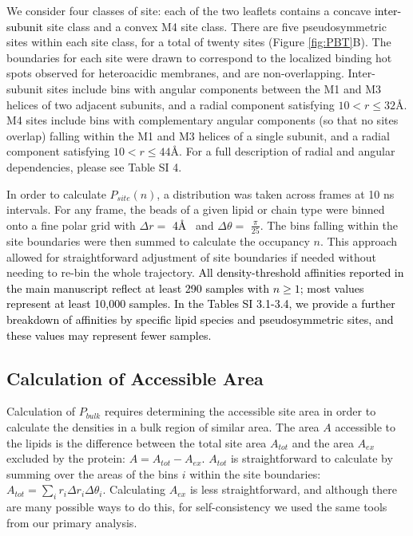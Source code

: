 \documentclass[%
 aip,
 amsmath,amssymb,
 preprint,%
]{revtex4-1}\usepackage{setspace}
\newcommand{\liam}[1]{\textcolor{black}{#1}}
\newcommand{\grace}[1]{\textcolor{black}{{#1}}}
\begin{document}
We consider four classes of site: each of the two leaflets contains a concave \liam{inter-subunit} site class and a convex M4 site class. There are five pseudosymmetric sites within each site class, for a total of twenty sites (Figure \ref{fig:PBT}B).  The boundaries for each site were drawn to correspond to the localized binding hot spots observed for heteroacidic membranes\cite{Woods2019}, and are non-overlapping. Inter-subunit sites include bins with angular components between the M1 and M3 helices of two adjacent subunits, and a radial component satisfying $10<r\leq32$\AA.  M4 sites include bins with complementary angular components (so that no sites overlap) falling within the M1 and M3 helices of a single subunit, and a radial component satisfying $10<r\leq44$\AA. For a full description of radial and angular dependencies, please see Table SI 4. 

In order to calculate $P_{site}(n)$, a distribution was taken across frames at 10 ns intervals. For any frame, the  beads of a given lipid or chain type were binned onto a fine polar grid with $\Delta r=$  \liam{4\AA~} and $\Delta \theta=$ $\frac{\pi}{25}$. The bins falling within the site boundaries were then summed to calculate the occupancy $n$.  This approach allowed for straightforward adjustment of site boundaries if needed without needing to re-bin the whole trajectory. \grace{All density-threshold affinities reported in the main manuscript reflect at least 290 samples with $n\ge 1$; most values represent at least 10,000 samples.  In the Tables SI 3.1-3.4, we provide a further breakdown of affinities by specific lipid species and pseudosymmetric sites, and these values may represent fewer samples.} 

\subsection{Calculation of Accessible Area}

Calculation of $P_{bulk}$ requires determining the accessible site area in order to calculate the densities in a bulk region of similar area. The area $A$ accessible to the lipids is the difference between the total site area $A_{tot}$ and the area $A_{ex}$ excluded by the protein: $A = A_{tot} - A_{ex}$\liam{.} 
$A_{tot}$ is straightforward to calculate by summing over the areas of the bins $i$ within the site boundaries: $A_{tot} = \sum_i r_i \Delta r_i  \Delta \theta_i$.  Calculating $A_{ex}$ is less straightforward, and although there are many possible ways to do this, for self-consistency we used the same tools from our primary analysis.  
\end{document}
